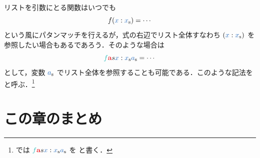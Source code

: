 \documentclass[a5paper,twoside,fleqn,draft]{jsbook}
\begin{document}
リストを引数にとる関数はいつでも
\begin{equation}
  f(\hVar{x}:\hListVar{x})
  =\dotsb
\end{equation}
という風にパタンマッチを行えるが，式の右辺でリスト全体すなわち $(\hVar{x}:\hListVar{x})$ を参照したい場合もあるであろう．そのような場合は
\begin{equation}
  \hFunc{f}\hTypeName{a}s{\hVar{x}:\hListVar{x}}{\hListVar{a}}%
  =\dotsb
\end{equation}
として，変数 $\hListVar{a}$ でリスト全体を参照することも可能である．このような記法をと呼ぶ．\footnote{\haskell では $\hFunc{f}\hTypeName{a}s{\hVar{x}:\hListVar{x}}{\hListVar{a}}$ を  と書く．}

\section{この章のまとめ}
\end{document}
